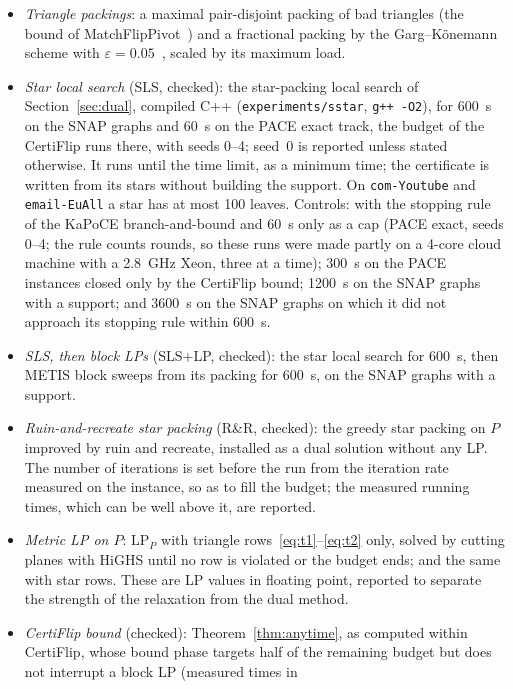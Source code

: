 \begin{itemize}
\item \emph{Triangle packings}: a maximal pair-disjoint packing of bad
triangles (the bound of MatchFlipPivot~\cite{veldt2022stc}) and a
fractional packing by the Garg--K\"onemann scheme with
$\varepsilon=0.05$~\cite{GargK07,Fleischer00}, scaled by its maximum load.
\item \emph{Star local search} (SLS, checked): the star-packing local search
of Section~\ref{sec:dual}, compiled C++ (\texttt{experiments/sstar},
\texttt{g++ -O2}), for \SI{600}{s} on the SNAP graphs and \SI{60}{s} on the
PACE exact track, the budget of the CertiFlip runs there, with seeds 0--4;
seed~0 is reported unless stated otherwise.  It runs until the time limit,
as a minimum time; the certificate is written from its stars without
building the support.  On \texttt{com-Youtube} and \texttt{email-EuAll} a
star has at most 100 leaves.  Controls: with the stopping rule of the KaPoCE
branch-and-bound and \SI{60}{s} only as a cap (PACE exact, seeds 0--4; the
rule counts rounds, so these runs were made partly on a 4-core cloud machine
with a \SI{2.8}{GHz} Xeon, three at a time); \SI{300}{s} on the PACE
instances closed only by the CertiFlip bound; \SI{1200}{s} on the SNAP graphs
with a support; and \SI{3600}{s} on the SNAP graphs on which it did not
approach its stopping rule within \SI{600}{s}.
\item \emph{SLS, then block LPs} (SLS+LP, checked): the star local search for
\SI{600}{s}, then METIS block sweeps from its packing for \SI{600}{s}, on the
SNAP graphs with a support.
\item \emph{Ruin-and-recreate star packing} (R\&R, checked): the greedy star
packing on $P$ improved by ruin and recreate, installed as a dual solution
without any LP.
The number of iterations is set before the run from the iteration rate
measured on the instance, so as to fill the budget; the measured running
times, which can be well above it, are reported.
\item \emph{Metric LP on $P$}: $\mathrm{LP}_P$ with triangle
rows~\eqref{eq:t1}--\eqref{eq:t2} only, solved by cutting planes with HiGHS
until no row is violated or the budget ends; and the same with star rows.
These are LP values in floating point, reported to separate the strength of
the relaxation from the dual method.
\item \emph{CertiFlip bound} (checked): Theorem~\ref{thm:anytime}, as
computed within CertiFlip, whose bound phase targets half of the remaining
budget but does not interrupt a block LP (measured times in

\end{itemize}
